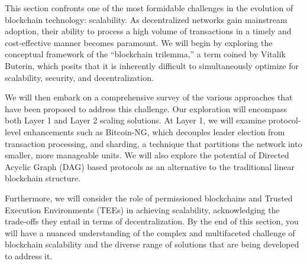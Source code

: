 

%
%
%

This section confronts one of the most formidable challenges in the
evolution of blockchain technology: scalability. As decentralized
networks gain mainstream adoption, their ability to process a high
volume of transactions in a timely and cost-effective manner becomes
paramount. We will begin by exploring the conceptual framework of the
``blockchain trilemma,'' a term coined by Vitalik Buterin, which posits
that it is inherently difficult to simultaneously optimize for
scalability, security, and decentralization.

We will then embark on a comprehensive survey of the various approaches
that have been proposed to address this challenge. Our exploration will
encompass both Layer 1 and Layer 2 scaling solutions. At Layer 1, we
will examine protocol-level enhancements such as Bitcoin-NG, which
decouples leader election from transaction processing, and sharding, a
technique that partitions the network into smaller, more manageable
units. We will also explore the potential of Directed Acyclic Graph
(DAG) based protocols as an alternative to the traditional linear
blockchain structure.

Furthermore, we will consider the role of permissioned blockchains and
Trusted Execution Environments (TEEs) in achieving scalability,
acknowledging the trade-offs they entail in terms of decentralization.
By the end of this section, you will have a nuanced understanding of the
complex and multifaceted challenge of blockchain scalability and the
diverse range of solutions that are being developed to address it.

